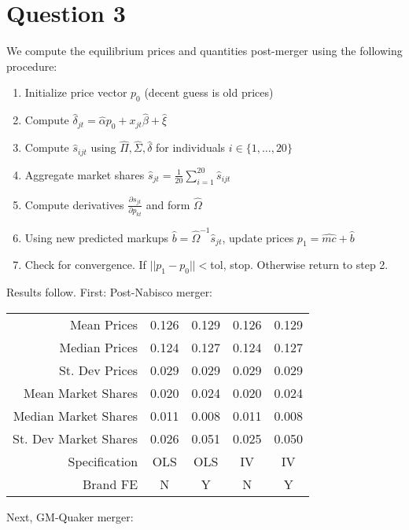 \documentclass[11pt]{article} %
\begin{document}
\section{Question 3}
We compute the equilibrium prices and quantities post-merger using the following procedure:
\begin{enumerate}
\item Initialize price vector $p_0$ (decent guess is old prices)
\item Compute $\hat{\delta}_{jt} = \hat{\alpha}p_0 + x_{jt}\hat{\beta} + \hat{\xi}$
\item Compute $\hat{s}_{ijt}$ using $\hat{\Pi}, \hat{\Sigma}, \hat{\delta}$ for individuals $i \in \{1,\dots,20\}$
\item Aggregate market shares $\hat{s}_{jt} = \frac{1}{20}\sum_{i=1}^{20} \hat{s}_{ijt}$
\item Compute derivatives $\frac{\partial s_{jt}}{\partial p_{kt}}$ and form $\hat{\Omega}$
\item Using new predicted markups $\hat{b} = \hat{\Omega}^{-1}\hat{s}_{jt}$, update prices $p_1 = \hat{mc} + \hat{b}$
\item Check for convergence. If $||p_1 - p_0||<$tol, stop. Otherwise return to step 2. 
\end{enumerate}

Results follow. First: Post-Nabisco merger:

\begin{center}
\begin{tabular}{r |c c c c}
\hline \hline
Mean Prices & 0.126 & 0.129 & 0.126 & 0.129 \\
Median Prices & 0.124 & 0.127 & 0.124 & 0.127 \\
St. Dev Prices & 0.029 & 0.029 & 0.029 & 0.029 \\
Mean Market Shares & 0.020 & 0.024 & 0.020 & 0.024 \\
Median Market Shares & 0.011 & 0.008 & 0.011 & 0.008 \\
St. Dev Market Shares & 0.026 & 0.051 & 0.025 & 0.050 \\
\hline
Specification & OLS & OLS & IV & IV \\
Brand FE & N & Y & N & Y \\
\hline
\end{tabular}
\end{center}

Next, GM-Quaker merger:
\end{document}
